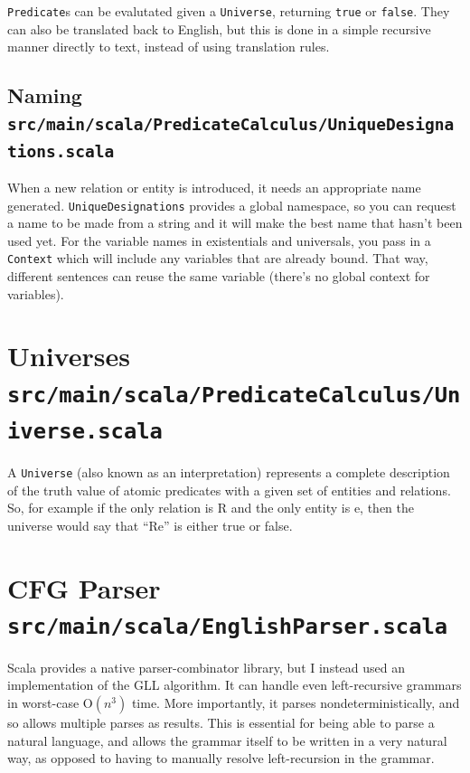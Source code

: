 \documentclass[a4paper, 11pt]{article}
\begin{document}
\texttt{Predicate}s can be evalutated given a \texttt{Universe}, returning \texttt{true} or \texttt{false}. They can also be translated back to English, but this is done in a simple recursive manner directly to text, instead of using translation rules.

\subsection[Naming]{Naming\\
	\normalsize \texttt{src/main/scala/PredicateCalculus/UniqueDesignations.scala}}
When a new relation or entity is introduced, it needs an appropriate name generated. \texttt{UniqueDesignations} provides a global namespace, so you can request a name to be made from a string and it will make the best name that hasn't been used yet. For the variable names in existentials and universals, you pass in a \texttt{Context} which will include any variables that are already bound. That way, different sentences can reuse the same variable (there's no global context for variables).

\section[Universes]{Universes\\
	\normalsize \texttt{src/main/scala/PredicateCalculus/Universe.scala}}
    A \texttt{Universe} (also known as an interpretation) represents a complete description of the truth value of atomic predicates with a given set of entities and relations. So, for example if the only relation is R and the only entity is e, then the universe would say that ``Re'' is either true or false.

\section[CFG Parser]{CFG Parser\\
	\normalsize \texttt{src/main/scala/EnglishParser.scala}}
Scala provides a native parser-combinator library, but I instead used an implementation of the GLL\cite{GLL} algorithm. It can handle even left-recursive grammars in worst-case O$(n^3)$ time. More importantly, it parses nondeterministically, and so allows multiple parses as results. This is essential for being able to parse a natural language, and allows the grammar itself to be written in a very natural way, as opposed to having to manually resolve left-recursion in the grammar.
\end{document}
